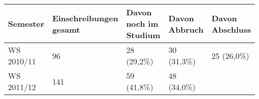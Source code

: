 \begin{longtable}[]{@{}lllll@{}}
\toprule
\begin{minipage}[b]{0.11\columnwidth}\raggedright\strut
Semester\strut
\end{minipage} & \begin{minipage}[b]{0.23\columnwidth}\raggedright\strut
Einschreibungen gesamt\strut
\end{minipage} & \begin{minipage}[b]{0.22\columnwidth}\raggedright\strut
Davon noch im Studium\strut
\end{minipage} & \begin{minipage}[b]{0.14\columnwidth}\raggedright\strut
Davon Abbruch\strut
\end{minipage} & \begin{minipage}[b]{0.16\columnwidth}\raggedright\strut
Davon Abschluss\strut
\end{minipage}\tabularnewline
\midrule
\endhead
\begin{minipage}[t]{0.11\columnwidth}\raggedright\strut
WS 2010/11\strut
\end{minipage} & \begin{minipage}[t]{0.23\columnwidth}\raggedright\strut
96\strut
\end{minipage} & \begin{minipage}[t]{0.22\columnwidth}\raggedright\strut
28 (29,2\%)\strut
\end{minipage} & \begin{minipage}[t]{0.14\columnwidth}\raggedright\strut
30 (31,3\%)\strut
\end{minipage} & \begin{minipage}[t]{0.16\columnwidth}\raggedright\strut
25 (26,0\%)\strut
\end{minipage}\tabularnewline
\begin{minipage}[t]{0.11\columnwidth}\raggedright\strut
WS 2011/12\strut
\end{minipage} & \begin{minipage}[t]{0.23\columnwidth}\raggedright\strut
141\strut
\end{minipage} & \begin{minipage}[t]{0.22\columnwidth}\raggedright\strut
59 (41,8\%)\strut
\end{minipage} & \begin{minipage}[t]{0.14\columnwidth}\raggedright\strut
48 (34,0\%)\strut
\end{minipage} & \begin{minipage}[t]{0.16\columnwidth}\raggedright\strut

\end{minipage}
\end{longtable}
